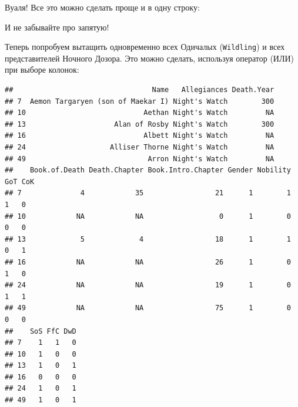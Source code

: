 \documentclass[]{book}
\newenvironment{Shaded}{\begin{snugshade}}{\end{snugshade}}
\newcommand{\KeywordTok}[1]{\textcolor[rgb]{0.13,0.29,0.53}{\textbf{#1}}}
\newcommand{\NormalTok}[1]{#1}
\newcommand{\OperatorTok}[1]{\textcolor[rgb]{0.81,0.36,0.00}{\textbf{#1}}}
\newcommand{\StringTok}[1]{\textcolor[rgb]{0.31,0.60,0.02}{#1}}
\begin{document}
Вуаля!
Все это можно сделать проще и в одну строку:

\begin{Shaded}
\end{Shaded}

И не забывайте про запятую!

Теперь попробуем вытащить одновременно всех Одичалых (\texttt{Wildling}) и всех представителей Ночного Дозора. Это можно сделать, используя оператор \texttt{\textbar{}} (ИЛИ) при выборе колонок:

\begin{Shaded}
\end{Shaded}

\begin{verbatim}
##                                 Name   Allegiances Death.Year
## 7  Aemon Targaryen (son of Maekar I) Night's Watch        300
## 10                            Aethan Night's Watch         NA
## 13                     Alan of Rosby Night's Watch        300
## 16                            Albett Night's Watch         NA
## 24                    Alliser Thorne Night's Watch         NA
## 49                             Arron Night's Watch         NA
##    Book.of.Death Death.Chapter Book.Intro.Chapter Gender Nobility GoT CoK
## 7              4            35                 21      1        1   1   0
## 10            NA            NA                  0      1        0   0   0
## 13             5             4                 18      1        1   0   1
## 16            NA            NA                 26      1        0   1   0
## 24            NA            NA                 19      1        0   1   1
## 49            NA            NA                 75      1        0   0   0
##    SoS FfC DwD
## 7    1   1   0
## 10   1   0   0
## 13   1   0   1
## 16   0   0   0
## 24   1   0   1
## 49   1   0   1
\end{verbatim}
\end{document}
